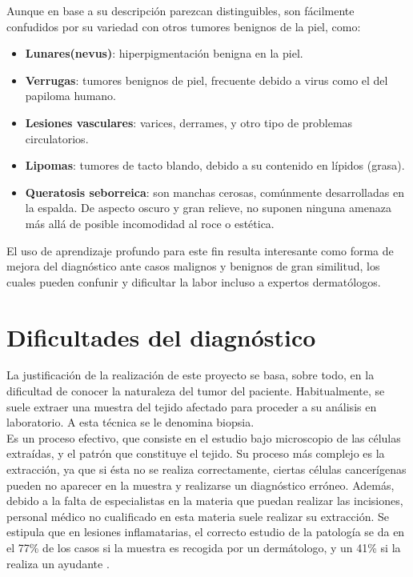 Aunque en base a su descripción parezcan distinguibles, son fácilmente confudidos por su variedad con otros tumores benignos de la piel, como:

\begin{itemize}
	\item \textbf{Lunares(nevus)}: hiperpigmentación benigna en la piel.
	\item \textbf{Verrugas}: tumores benignos de piel, frecuente debido a virus como el del papiloma humano.
	\item \textbf{Lesiones vasculares}: varices, derrames, y otro tipo de problemas circulatorios.
	\item \textbf{Lipomas}: tumores de tacto blando, debido a su contenido en lípidos (grasa).
	\item \textbf{Queratosis seborreica}: son manchas cerosas, comúnmente desarrolladas en la espalda. De aspecto oscuro y gran relieve, no suponen ninguna amenaza más allá de posible incomodidad al roce o estética.
\end{itemize}

El uso de aprendizaje profundo para este fin resulta interesante como forma de mejora del diagnóstico ante casos malignos y benignos de gran similitud, los cuales pueden confunir y dificultar la labor incluso a expertos dermatólogos.

\section{Dificultades del diagnóstico}

La justificación de la realización de este proyecto se basa, sobre todo, en la dificultad de conocer la naturaleza del tumor del paciente. Habitualmente, se suele extraer una muestra del tejido afectado para proceder a su análisis en laboratorio. A esta técnica se le denomina biopsia.\\

Es un proceso efectivo, que consiste en el estudio bajo microscopio de las células extraídas, y el patrón que constituye el tejido. Su proceso más complejo es la extracción, ya que si ésta no se realiza correctamente, ciertas células cancerígenas pueden no aparecer en la muestra y realizarse un diagnóstico erróneo. Además, debido a la falta de especialistas en la materia que puedan realizar las incisiones, personal médico no cualificado en esta materia suele realizar su extracción. Se estipula que en lesiones inflamatarias, el correcto estudio de la patología se da en el 77\% de los casos si la muestra es recogida por un dermátologo, y un 41\% si la realiza un ayudante \cite{LLAMASVELASCO201212}.


